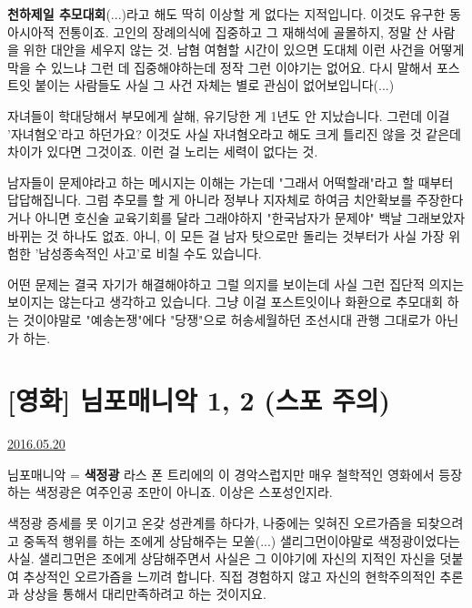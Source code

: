 \textbf{천하제일 추모대회}(...)라고 해도 딱히 이상할 게 없다는 지적입니다.
이것도 유구한 동아시아적 전통이죠. 고인의 장례의식에 집중하고 그 재해석에 골몰하지, 정말 산 사람을 위한 대안을 세우지 않는 것.
남혐 여혐할 시간이 있으면 도대체 이런 사건을 어떻게 막을 수 있느냐 그런 데 집중해야하는데 정작 그런 이야기는 없어요.
다시 말해서 포스트잇 붙이는 사람들도 사실 그 사건 자체는 별로 관심이 없어보입니다(...)
\vspace{5mm}

자녀들이 학대당해서 부모에게 살해, 유기당한 게 1년도 안 지났습니다. 그런데 이걸 '자녀혐오'라고 하던가요?
이것도 사실 자녀혐오라고 해도 크게 틀리진 않을 것 같은데 차이가 있다면 그것이죠. 이런 걸 노리는 세력이 없다는 것.
\vspace{5mm}

남자들이 문제야라고 하는 메시지는 이해는 가는데 "그래서 어떡할래"라고 할 때부터 답답해집니다.
그럼 추모를 할 게 아니라 정부나 지자체로 하여금 치안확보를 주장한다거나 아니면 호신술 교육기회를 달라 그래야하지
"한국남자가 문제야" 백날 그래보았자 바뀌는 것 하나도 없죠.
아니, 이 모든 걸 남자 탓으로만 돌리는 것부터가 사실 가장 위험한 '남성종속적인 사고'로 비칠 수도 있습니다.
\vspace{5mm}

어떤 문제는 결국 자기가 해결해야하고 그럴 의지를 보이는데 사실 그런 집단적 의지는 보이지는 않는다고 생각하고 있습니다.
그냥 이걸 포스트잇이나 화환으로 추모대회 하는 것이야말로 "예송논쟁"에다 "당쟁"으로 허송세월하던 조선시대 관행 그대로가 아닌가 하는.
\vspace{5mm}






\section{[영화] 님포매니악 1, 2 (스포 주의)}
\href{https://www.kockoc.com/Apoc/783977}{2016.05.20}

\vspace{5mm}

님포매니악 = \textbf{색정광}
라스 폰 트리에의 이 경악스럽지만 매우 철학적인 영화에서 등장하는 색정광은 여주인공 조만이 아니죠.
이상은 스포성인지라.
\vspace{5mm}

색정광 증세를 못 이기고 온갖 성관계를 하다가, 나중에는 잊혀진 오르가즘을 되찾으려고 중독적 행위를 하는 조에게
상담해주는 모쏠(...) 샐리그먼이야말로 색정광이었다는 사실.
샐리그먼은 조에게 상담해주면서 사실은 그 이야기에 자신의 지적인 자신을 덧붙여 추상적인 오르가즘을 느끼려 합니다.
직접 경험하지 않고 자신의 현학주의적인 추론과 상상을 통해서 대리만족하려고 하는 것이지요.
\vspace{5mm}

